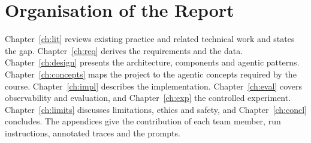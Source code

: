 \section{Organisation of the Report}
Chapter~\ref{ch:lit} reviews existing practice and related technical work and states the gap.
Chapter~\ref{ch:req} derives the requirements and the data. Chapter~\ref{ch:design} presents the
architecture, components and agentic patterns. Chapter~\ref{ch:concepts} maps the project to the agentic
concepts required by the course. Chapter~\ref{ch:impl} describes the implementation.
Chapter~\ref{ch:eval} covers observability and evaluation, and Chapter~\ref{ch:exp} the controlled
experiment. Chapter~\ref{ch:limits} discusses limitations, ethics and safety, and Chapter~\ref{ch:concl}
concludes. The appendices give the contribution of each team member, run instructions, annotated traces
and the prompts.

